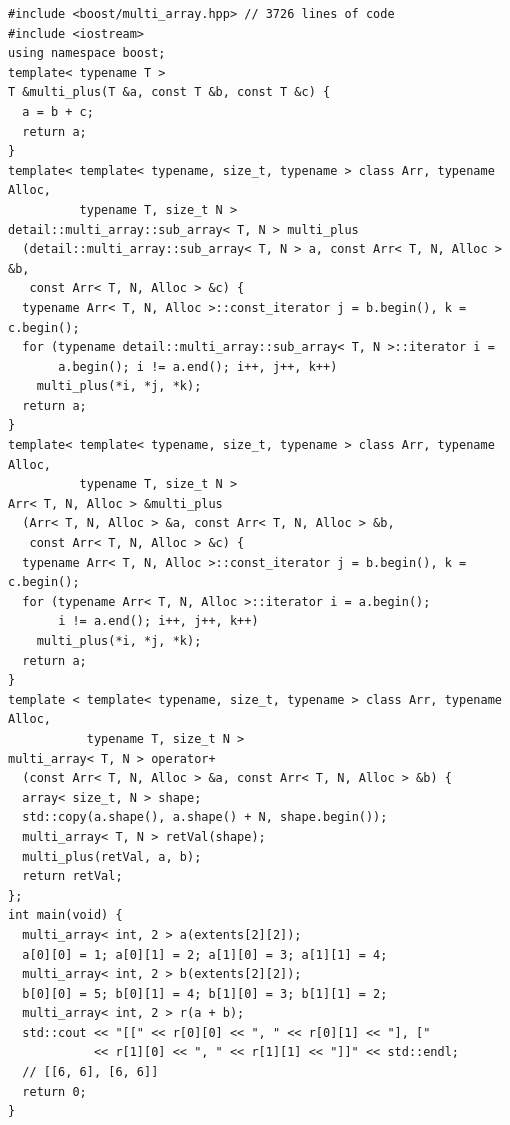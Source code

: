 \documentclass[12pt,a4paper,oneside,openright]{book}
\newcommand{\cout}{Comment lines (preceded with ``//'') show the output of the program}
\begin{document}
\begin{CJK}{UTF8}{}
\lstset{language=C++,frame=single,numbers=none}
\begin{lstlisting}[float=htbp,caption={Multi-dimensional ``+'' operator implemented in C++. \cout},label=lst:cop]
#include <boost/multi_array.hpp> // 3726 lines of code
#include <iostream>
using namespace boost;
template< typename T >
T &multi_plus(T &a, const T &b, const T &c) {
  a = b + c;
  return a;
}
template< template< typename, size_t, typename > class Arr, typename Alloc,
          typename T, size_t N >
detail::multi_array::sub_array< T, N > multi_plus
  (detail::multi_array::sub_array< T, N > a, const Arr< T, N, Alloc > &b,
   const Arr< T, N, Alloc > &c) {
  typename Arr< T, N, Alloc >::const_iterator j = b.begin(), k = c.begin();
  for (typename detail::multi_array::sub_array< T, N >::iterator i =
       a.begin(); i != a.end(); i++, j++, k++)
    multi_plus(*i, *j, *k);
  return a;
}
template< template< typename, size_t, typename > class Arr, typename Alloc,
          typename T, size_t N >
Arr< T, N, Alloc > &multi_plus
  (Arr< T, N, Alloc > &a, const Arr< T, N, Alloc > &b,
   const Arr< T, N, Alloc > &c) {
  typename Arr< T, N, Alloc >::const_iterator j = b.begin(), k = c.begin();
  for (typename Arr< T, N, Alloc >::iterator i = a.begin();
       i != a.end(); i++, j++, k++)
    multi_plus(*i, *j, *k);
  return a;
}
template < template< typename, size_t, typename > class Arr, typename Alloc,
           typename T, size_t N >
multi_array< T, N > operator+
  (const Arr< T, N, Alloc > &a, const Arr< T, N, Alloc > &b) {
  array< size_t, N > shape;
  std::copy(a.shape(), a.shape() + N, shape.begin());
  multi_array< T, N > retVal(shape);
  multi_plus(retVal, a, b);
  return retVal;
};
int main(void) {
  multi_array< int, 2 > a(extents[2][2]);
  a[0][0] = 1; a[0][1] = 2; a[1][0] = 3; a[1][1] = 4;
  multi_array< int, 2 > b(extents[2][2]);
  b[0][0] = 5; b[0][1] = 4; b[1][0] = 3; b[1][1] = 2;
  multi_array< int, 2 > r(a + b);
  std::cout << "[[" << r[0][0] << ", " << r[0][1] << "], ["
            << r[1][0] << ", " << r[1][1] << "]]" << std::endl;
  // [[6, 6], [6, 6]]
  return 0;
}
\end{lstlisting}


\end{CJK}
\end{document}
